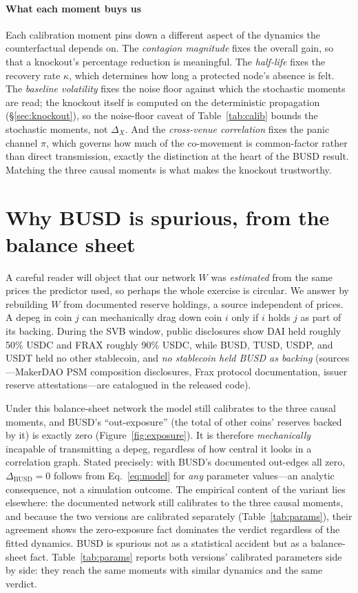\documentclass[sigconf,anonymous]{acmart}
\begin{document}
\paragraph{What each moment buys us} Each calibration moment pins down a different aspect of
the dynamics the counterfactual depends on. The \emph{contagion magnitude}
fixes the overall gain, so that a knockout's percentage reduction is meaningful. The \emph{half-life}
fixes the recovery rate $\kappa$, which determines how long a protected node's absence is felt. The
\emph{baseline volatility} fixes the noise floor against which the stochastic moments are read;
the knockout itself is computed on the deterministic propagation (\S\ref{sec:knockout}), so the
noise-floor caveat of Table~\ref{tab:calib} bounds the stochastic moments, not $\Delta_X$. And
the \emph{cross-venue correlation} fixes the panic channel $\pi$, which governs how much
of the co-movement is common-factor rather than direct transmission, exactly the distinction at the
heart of the BUSD result. Matching the three causal moments is what makes the
knockout trustworthy.

\section{Why BUSD is spurious, from the balance sheet}\label{sec:exposure}
A careful reader will object that our network $W$ was \emph{estimated} from the same prices the
predictor used, so perhaps the whole exercise is circular. We answer by rebuilding $W$ from documented reserve
holdings, a source independent of prices. A depeg in coin $j$ can
mechanically drag down coin $i$ only if $i$ holds $j$ as part of its backing. During the SVB window,
public disclosures show DAI held roughly 50\% USDC and FRAX roughly 90\% USDC, while BUSD, TUSD, USDP,
and USDT held no other stablecoin, and \emph{no stablecoin held BUSD as backing} (sources---MakerDAO
PSM composition disclosures, Frax protocol documentation, issuer reserve attestations---are
catalogued in the released code).

Under this balance-sheet network the model still calibrates to the three causal moments, and BUSD's
``out-exposure'' (the total of other coins' reserves backed by it) is exactly zero
(Figure~\ref{fig:exposure}). It is therefore \emph{mechanically} incapable of transmitting a depeg,
regardless of how central it looks in a correlation graph. Stated precisely: with BUSD's
documented out-edges all zero, $\Delta_{\text{BUSD}}=0$ follows from Eq.~\eqref{eq:model} for
\emph{any} parameter values---an analytic consequence, not a simulation outcome. The empirical
content of the variant lies elsewhere: the documented network still calibrates to the three
causal moments, and because the two versions are calibrated separately (Table~\ref{tab:params}),
their agreement shows the zero-exposure fact dominates the verdict regardless of the fitted
dynamics. BUSD is spurious not as a statistical accident but as a balance-sheet fact. Table~\ref{tab:params}
reports both versions' calibrated parameters side by side: they reach the same moments with similar
dynamics and the same verdict.
\end{document}
